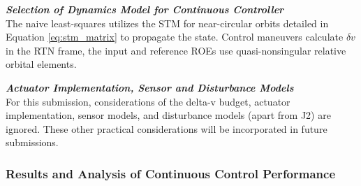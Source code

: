 \textbf{\textit{Selection of Dynamics Model for Continuous Controller}} \\
The naive least-squares utilizes the STM for near-circular orbits detailed in Equation \ref{eq:stm_matrix} to propagate the state. Control maneuvers calculate $\delta v$ in the RTN frame, the input and reference ROEs use quasi-nonsingular relative orbital elements.

\textbf{\textit{Actuator Implementation, Sensor and Disturbance Models}} \\
For this submission, considerations of the delta-v budget, actuator implementation, sensor models, and disturbance models (apart from J2) are ignored. These other practical considerations will be incorporated in future submissions.

\subsubsection{Results and Analysis of Continuous Control Performance} \label{sec:analysis_of_control_cont}
